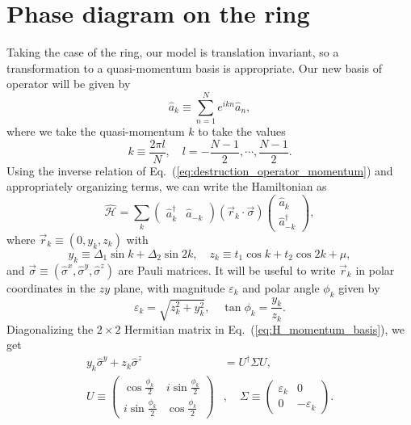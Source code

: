 \documentclass[a4paper]{article}
\newcommand{\en}{\varepsilon}
\newcommand{\Ha}{\hat{\mathcal{H}}}
\newcommand{\Sv}{\vec{\sigma}}
\newcommand{\Sp}[1]{\hat{\sigma}^{#1}}
\newcommand{\C}{\hat{a}^{\dagger}}
\newcommand{\D}{\hat{a}}
\begin{document}
\section{Phase diagram on the ring}
\label{sec:phase_diagram_on_the_ring}

Taking the case of the ring, our model is translation invariant, so a transformation to a quasi-momentum basis is appropriate. Our new basis of operator will be given by
\begin{equation}
	\D_k \equiv \sum_{n=1}^{N} e^{i k n} \D_n,
	\label{eq:destruction_operator_momentum}
\end{equation}
where we take the quasi-momentum $k$ to take the values
\begin{equation}
	k \equiv \frac{2\pi l}{N},\quad l=-\frac{N-1}{2},\cdots,\frac{N-1}{2}.
\end{equation}
%
Using the inverse relation of Eq.~(\ref{eq:destruction_operator_momentum}) and appropriately organizing terms, we can write the Hamiltonian as
\begin{equation}
	\label{eq:H_momentum_basis}
	\Ha = \sum_{k}
	\left(\begin{matrix}
		\C_k & \D_{-k}
	\end{matrix}\right)
	\left(\vec{r}_k \cdot \Sv\right)
	\left(\begin{matrix}
		\D_k \\
		\C_{-k}
	\end{matrix}\right),
\end{equation}
where
$
\vec{r}_k \equiv (0,y_k,z_k)
$
with
\begin{equation}
	y_k \equiv \Delta_1 \sin{k} + \Delta_2 \sin{2k},\quad
	z_k \equiv t_1 \cos{k} + t_2 \cos{2k} + \mu,
\end{equation}
and
$
\Sv \equiv (\Sp{x},\Sp{y},\Sp{z})
$
are Pauli matrices. It will be useful to write $\vec{r}_k$ in polar coordinates in the $zy$ plane, with magnitude $\en_k$ and polar angle $\phi_k$ given by
\begin{equation}
	\en_k = \sqrt{z_k^2 + y_k^2},\quad
	\tan{\phi_k} = \frac{y_k}{z_k}.
\end{equation}
Diagonalizing the $2 \times 2$ Hermitian matrix in Eq.~(\ref{eq:H_momentum_basis}), we get
\begin{align}
	y_k \Sp{y} + z_k \Sp{z} &= U^{\dagger} \Sigma U,\\
	U \equiv
	\left(\begin{matrix}
		\cos{\frac{\phi_k}{2}}  & i\sin{\frac{\phi_k}{2}} \\
		i\sin{\frac{\phi_k}{2}} & \cos{\frac{\phi_k}{2}}
	\end{matrix}\right)&,\quad
	\Sigma\equiv
	\left(\begin{matrix}
		\en_k & 0 \\
		0 & -\en_k
	\end{matrix}\right).
\end{align}
\end{document}
